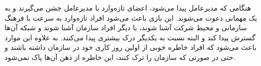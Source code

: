 هنگامی که مدیرعامل پیدا می‌شود، اعضای تازه‌وارد با مدیرعامل جشن می‌گیرند و به یک مهمانی دعوت می‌شوند. 
این بازی باعث می‌شود افراد تازه‌وارد به سرعت با فرهنگ سازمانی و محیط شرکت آشنا شوند، با دیگر افراد سازمان آشنا شوند و شبکه آن‌ها گسترش پیدا کند و البته نسبت به یکدیگر درک بیشتری پیدا می‌کنند. به علاوه این موارد باعث می‌شود که افراد خاطره خوبی از اولین روز کاری خود در سازمان داشته باشند و حتی در صورتی که سازمان را ترک کنند، این خاطره از ذهن آن‌ها پاک نمی‌شود.
